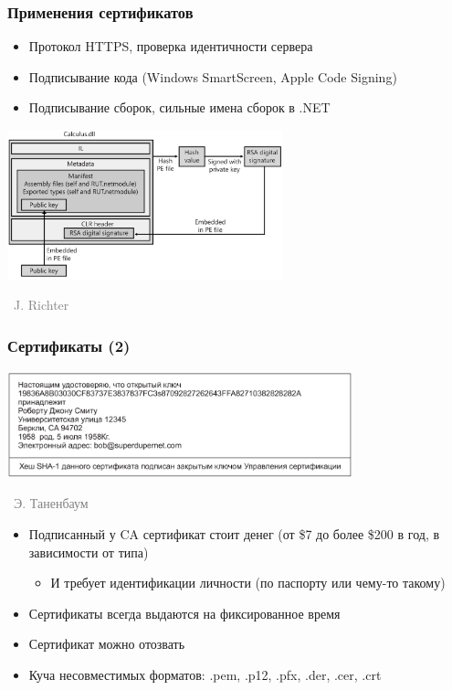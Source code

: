 \documentclass[xetex,mathserif,serif]{beamer}
\newcommand{\attribution}[1] {
\vspace{-5mm}\begin{flushright}\begin{scriptsize}\textcolor{gray}{\textcopyright\, #1}\end{scriptsize}\end{flushright}
}
\begin{document}
	\begin{frame}
		\frametitle{Применения сертификатов}
		\begin{itemize}
			\item Протокол HTTPS, проверка идентичности сервера
			\item Подписывание кода (Windows SmartScreen, Apple Code Signing)
			\item Подписывание сборок, сильные имена сборок в .NET
		\end{itemize}
		\begin{center}
			\includegraphics[width=0.6\textwidth]{dotNetCodeSigning.png}
			\attribution{J. Richter}
		\end{center}
	\end{frame}

	\begin{frame}
		\frametitle{Сертификаты (2)}
		\begin{center}
			\includegraphics[width=0.75\textwidth]{certificate.png}
			\attribution{Э. Таненбаум}
		\end{center}
		\begin{itemize}
			\item Подписанный у CA сертификат стоит денег (от \$7 до более \$200 в год, в зависимости от типа)
			\begin{itemize}
				\item И требует идентификации личности (по паспорту или чему-то такому)
			\end{itemize}
			\item Сертификаты всегда выдаются на фиксированное время
			\item Сертификат можно отозвать
			\item Куча несовместимых форматов: .pem, .p12, .pfx, .der, .cer, .crt
		\end{itemize}
	\end{frame}
\end{document}
